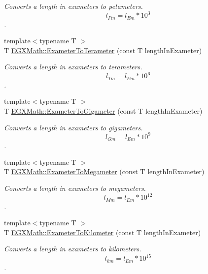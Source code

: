 \begin{DoxyCompactItemize}
\begin{DoxyCompactList}\small\item\em Converts a length in exameters to petameters. \[ l_{Pm}=l_{Em} * 10^{3} \]. \end{DoxyCompactList}\item 
{\footnotesize template$<$typename T $>$ }\\T \mbox{\hyperlink{group___e_g_x_math-_conversions-_length_conversions-_exameter-_s_i_gaf16e87fbeccc6175baa72ed6bb9db027}{E\+G\+X\+Math\+::\+Exameter\+To\+Terameter}} (const T length\+In\+Exameter)
\begin{DoxyCompactList}\small\item\em Converts a length in exameters to terameters. \[ l_{Tm}=l_{Em} * 10^{6} \]. \end{DoxyCompactList}\item 
{\footnotesize template$<$typename T $>$ }\\T \mbox{\hyperlink{group___e_g_x_math-_conversions-_length_conversions-_exameter-_s_i_gae0a019ba27e962c891f014ae4748fd14}{E\+G\+X\+Math\+::\+Exameter\+To\+Gigameter}} (const T length\+In\+Exameter)
\begin{DoxyCompactList}\small\item\em Converts a length in exameters to gigameters. \[ l_{Gm}=l_{Em} * 10^{9} \]. \end{DoxyCompactList}\item 
{\footnotesize template$<$typename T $>$ }\\T \mbox{\hyperlink{group___e_g_x_math-_conversions-_length_conversions-_exameter-_s_i_gac3451985da098b2668e48c30468efd83}{E\+G\+X\+Math\+::\+Exameter\+To\+Megameter}} (const T length\+In\+Exameter)
\begin{DoxyCompactList}\small\item\em Converts a length in exameters to megameters. \[ l_{Mm}=l_{Em} * 10^{12} \]. \end{DoxyCompactList}\item 
{\footnotesize template$<$typename T $>$ }\\T \mbox{\hyperlink{group___e_g_x_math-_conversions-_length_conversions-_exameter-_s_i_gad8c1732c3b4a07b330d5327c099bbd7c}{E\+G\+X\+Math\+::\+Exameter\+To\+Kilometer}} (const T length\+In\+Exameter)
\begin{DoxyCompactList}\small\item\em Converts a length in exameters to kilometers. \[ l_{km}=l_{Em} * 10^{15} \]. \end{DoxyCompactList}\item 

\end{DoxyCompactItemize}

